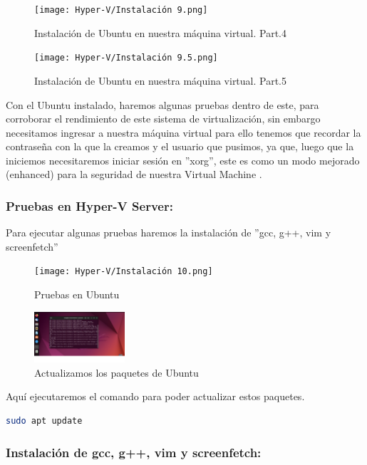 \documentclass[journal]{IEEEtran}
\begin{document}
\begin{figure}[htbp]
  \centering
  \texttt{[image: Hyper-V/Instalación 9.png]}
  \caption{Instalación de Ubuntu en nuestra máquina virtual. Part.4}
\end{figure}

\begin{figure}[htbp]
  \centering
  \texttt{[image: Hyper-V/Instalación 9.5.png]}
  \caption{Instalación de Ubuntu en nuestra máquina virtual. Part.5}
\end{figure}

Con el Ubuntu instalado, haremos algunas pruebas dentro de este, para corroborar el rendimiento de este sistema de virtualización, sin embargo necesitamos ingresar a nuestra máquina virtual para ello tenemos que recordar la contraseña con la que la creamos y el usuario que pusimos\cite{VirtualM}, ya que, luego que la iniciemos necesitaremos iniciar sesión en ''xorg'', este es como un modo mejorado (enhanced) para la seguridad de nuestra Virtual Machine \cite{Xorg}.

\subsubsection{Pruebas en Hyper-V Server:}

Para ejecutar algunas pruebas haremos la instalación de ''gcc, g++, vim y screenfetch''\\

\begin{figure}[htbp]
  \centering
  \texttt{[image: Hyper-V/Instalación 10.png]}
  \caption{Pruebas en Ubuntu}
\end{figure}

\begin{figure}[htbp]
  \centering
  \includegraphics[width=0.3\textwidth]{Hyper-V/1.png}
  \caption{Actualizamos los paquetes de Ubuntu}
\end{figure}

Aquí ejecutaremos el comando para poder actualizar estos paquetes.\\
\begin{lstlisting}[language=bash]
sudo apt update
\end{lstlisting}

\subsubsection{Instalación de gcc, g++, vim y screenfetch:}
\end{document}
